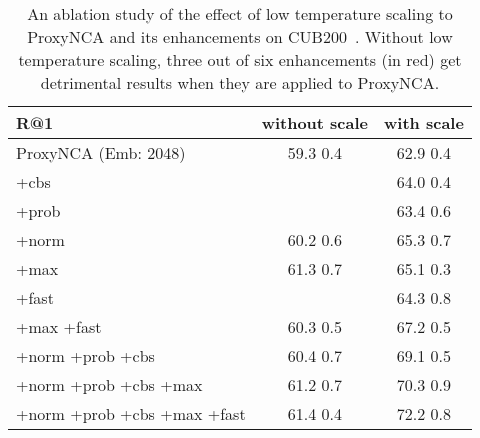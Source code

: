 \documentclass[runningheads]{llncs}
\begin{document}
\begin{table}[ht]
\caption{An ablation study of the effect of low temperature scaling to ProxyNCA and its enhancements on CUB200~\cite{wah2011caltech}. Without low temperature scaling, three out of six enhancements (in red) get detrimental results when they are applied to ProxyNCA.}
\centering
\setlength{\tabcolsep}{3pt}
\begin{tabular}{|l|c|c|}
\hline
R@1 & without scale & with scale  \\ \hline
\small{ProxyNCA (Emb: 2048)}& 59.3  0.4 & 62.9   0.4\\
\hspace{0.3cm}\small{+cbs}& \color{red}{54.8  6.2} & 64.0  0.4 \\
\hspace{0.3cm}\small{+prob}& \color{red}{59.0  0.4} & 63.4  0.6 \\
\hspace{0.3cm}\small{+norm}& 60.2  0.6 & 65.3  0.7 \\
\hspace{0.3cm}\small{+max}& 61.3  0.7 & 65.1   0.3\\
\hspace{0.3cm}\small{+fast}& \color{red}{56.3  0.8} & 64.3   0.8\\
\hspace{0.3cm}\small{+max +fast} & 60.3  0.5 & 67.2  0.5 \\
\hspace{0.3cm}\small{+norm +prob +cbs} & 60.4  0.7 & 69.1   0.5\\
\hspace{0.3cm}\small{+norm +prob +cbs +max} & 61.2  0.7 & 70.3   0.9\\
\hspace{0.3cm}\small{+norm +prob +cbs +max +fast}& 61.4  0.4 & 72.2  0.8 \\
\hline
\end{tabular}
\label{table:tempscale_det}
\end{table}
\end{document}
